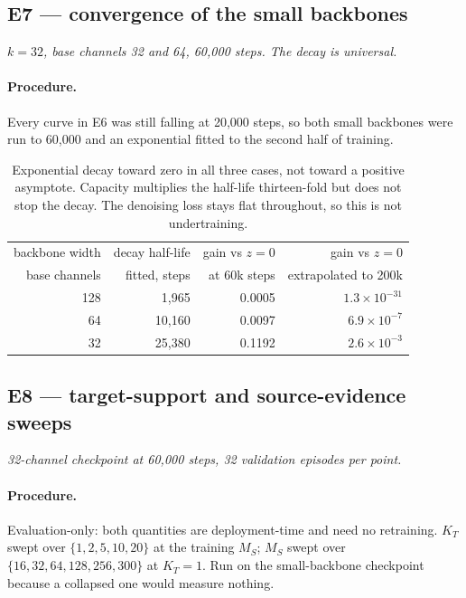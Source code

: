 \documentclass[11pt]{article}
\newcommand{\KT}{K_{T}}
\newcommand{\MS}{M_{S}}
\begin{document}
\subsection{E7 --- convergence of the small backbones}

\textit{$k=32$, base channels 32 and 64, 60{,}000 steps. The decay is universal.}

\paragraph{Procedure.} Every curve in E6 was still falling at 20{,}000 steps, so both small
backbones were run to 60{,}000 and an exponential fitted to the second half of training.

\begin{table}[htbp]
\centering\small
\begin{tabular}{@{}rrrr@{}}
\toprule
backbone width & decay half-life & gain vs $z=0$ & gain vs $z=0$ \\
base channels & fitted, steps & at 60k steps & extrapolated to 200k \\
\midrule
128 & 1{,}965  & 0.0005 & $1.3\times10^{-31}$ \\
 64 & 10{,}160 & 0.0097 & $6.9\times10^{-7}$ \\
 32 & 25{,}380 & 0.1192 & $2.6\times10^{-3}$ \\
\bottomrule
\end{tabular}
\caption{Exponential decay toward zero in all three cases, not toward a positive asymptote.
Capacity multiplies the half-life thirteen-fold but does not stop the decay. The denoising loss
stays flat throughout, so this is not undertraining.}
\end{table}

\subsection{E8 --- target-support and source-evidence sweeps}

\textit{32-channel checkpoint at 60{,}000 steps, 32 validation episodes per point.}

\paragraph{Procedure.} Evaluation-only: both quantities are deployment-time and need no retraining.
$\KT$ swept over $\{1,2,5,10,20\}$ at the training $\MS$; $\MS$ swept over
$\{16,32,64,128,256,300\}$ at $\KT=1$. Run on the small-backbone checkpoint because a collapsed one
would measure nothing.
\end{document}
